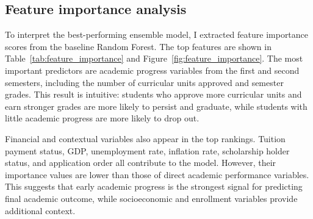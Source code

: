 \documentclass{article}
\begin{document}
\subsection{Feature importance analysis}

To interpret the best-performing ensemble model, I extracted feature importance scores from the baseline Random Forest. The top features are shown in Table~\ref{tab:feature_importance} and Figure~\ref{fig:feature_importance}. The most important predictors are academic progress variables from the first and second semesters, including the number of curricular units approved and semester grades. This result is intuitive: students who approve more curricular units and earn stronger grades are more likely to persist and graduate, while students with little academic progress are more likely to drop out.

Financial and contextual variables also appear in the top rankings. Tuition payment status, GDP, unemployment rate, inflation rate, scholarship holder status, and application order all contribute to the model. However, their importance values are lower than those of direct academic performance variables. This suggests that early academic progress is the strongest signal for predicting final academic outcome, while socioeconomic and enrollment variables provide additional context.

\begin{table}[t]
\centering
\caption{Top 15 Random Forest feature importances.}
\label{tab:feature_importance}
\end{table}
\end{document}
